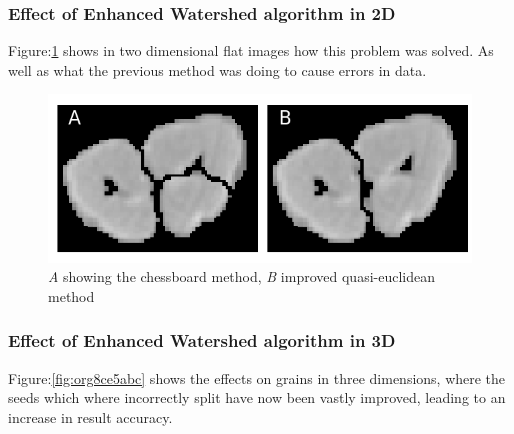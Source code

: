 \documentclass[11pt]{report}
\begin{document}
\subsubsection{Effect of Enhanced Watershed algorithm in 2D}
\label{sec:org0a82b7b}

Figure:\ref{fig:org77d3f3d} shows in two dimensional flat images how this problem was solved. As well as what the previous method was doing to cause errors in data.
\begin{figure}[htbp]
\centering
\includegraphics[width=16cm]{./images/chess_quasi.png}
\caption{\label{fig:org77d3f3d}
\emph{A} showing the chessboard method, \emph{B} improved quasi-euclidean method}
\end{figure}

\clearpage
\subsubsection{Effect of Enhanced Watershed algorithm in 3D}
\label{sec:org65ffac7}

Figure:\ref{fig:org8ce5abc} shows the effects on grains in three dimensions, where the seeds which where incorrectly split have now been vastly improved, leading to an increase in result accuracy.
\end{document}
